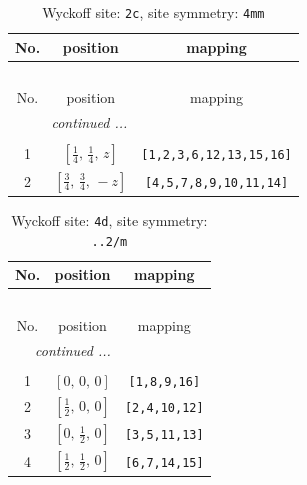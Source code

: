 \documentclass[fleqn,8pt]{jsarticle}
\begin{document}
\renewcommand{\arraystretch}{1.2}
\begin{longtable}{ccc}
\caption{Wyckoff site: {\tt 2c}, site symmetry: {\tt 4mm}}
 \\
 \hline \hline
No. & position & mapping \\ \hline \endfirsthead

\multicolumn{2}{l}{\tablename\ \thetable{}} \\
 \hline \hline
No. & position & mapping \\ \hline \endhead

 \hline \hline
\multicolumn{2}{r}{\footnotesize\it continued ...} \\ \endfoot

 \hline \hline
\multicolumn{2}{r}{} \\ \endlastfoot

1 & $\left[ \frac{1}{4},\, \frac{1}{4},\, z \right]$ & {\tt [1,2,3,6,12,13,15,16]} \\ \hline
2 & $\left[ \frac{3}{4},\, \frac{3}{4},\, - z \right]$ & {\tt [4,5,7,8,9,10,11,14]} \\
\end{longtable}
\renewcommand{\arraystretch}{1.2}
\begin{longtable}{ccc}
\caption{Wyckoff site: {\tt 4d}, site symmetry: {\tt ..2/m}}
 \\
 \hline \hline
No. & position & mapping \\ \hline \endfirsthead

\multicolumn{2}{l}{\tablename\ \thetable{}} \\
 \hline \hline
No. & position & mapping \\ \hline \endhead

 \hline \hline
\multicolumn{2}{r}{\footnotesize\it continued ...} \\ \endfoot

 \hline \hline
\multicolumn{2}{r}{} \\ \endlastfoot

1 & $\left[ 0,\, 0,\, 0 \right]$ & {\tt [1,8,9,16]} \\ \hline
2 & $\left[ \frac{1}{2},\, 0,\, 0 \right]$ & {\tt [2,4,10,12]} \\ \hline
3 & $\left[ 0,\, \frac{1}{2},\, 0 \right]$ & {\tt [3,5,11,13]} \\ \hline
4 & $\left[ \frac{1}{2},\, \frac{1}{2},\, 0 \right]$ & {\tt [6,7,14,15]} \\
\end{longtable}
\renewcommand{\arraystretch}{1.2}
\end{document}
